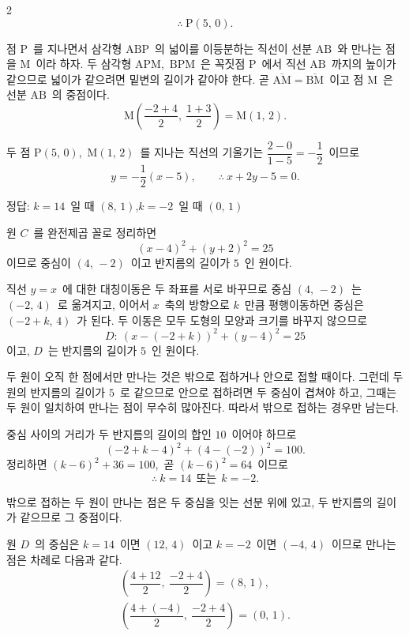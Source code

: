 \documentclass[10pt,fleqn]{article}
\begin{document}
\begin{multicols*}{2}
$$\therefore\ \mathrm{P}(5,\,0).$$

점 $\mathrm{P}$\ 를 지나면서 삼각형 $\mathrm{ABP}$\ 의 넓이를 이등분하는 직선이 선분 $\mathrm{AB}$\ 와 만나는 점을 $\mathrm{M}$\ 이라 하자. 두 삼각형 $\mathrm{APM}$,\ $\mathrm{BPM}$\ 은 꼭짓점 $\mathrm{P}$\ 에서 직선 $\mathrm{AB}$\ 까지의 높이가 같으므로 넓이가 같으려면 밑변의 길이가 같아야 한다. 곧 $\overline{\mathrm{AM}}=\overline{\mathrm{BM}}$\ 이고 점 $\mathrm{M}$\ 은 선분 $\mathrm{AB}$\ 의 중점이다.
$$\mathrm{M}\!\left(\dfrac{-2+4}{2},\ \dfrac{1+3}{2}\right)=\mathrm{M}(1,\,2).$$

두 점 $\mathrm{P}(5,\,0)$,\ $\mathrm{M}(1,\,2)$\ 를 지나는 직선의 기울기는 $\dfrac{2-0}{1-5}=-\dfrac{1}{2}$\ 이므로
$$y=-\dfrac{1}{2}(x-5),\qquad \therefore\ x+2y-5=0.$$

\begin{dmanswerbox}
정답: $k=14$\ 일 때 $(8,\,1)$,\quad $k=-2$\ 일 때 $(0,\,1)$
\end{dmanswerbox}

원 $C$\ 를 완전제곱 꼴로 정리하면
$$(x-4)^{2}+(y+2)^{2}=25$$
이므로 중심이 $(4,\,-2)$\ 이고 반지름의 길이가 $5$\ 인 원이다.

직선 $y=x$\ 에 대한 대칭이동은 두 좌표를 서로 바꾸므로 중심 $(4,\,-2)$\ 는 $(-2,\,4)$\ 로 옮겨지고, 이어서 $x$\ 축의 방향으로 $k$\ 만큼 평행이동하면 중심은 $(-2+k,\,4)$\ 가 된다. 두 이동은 모두 도형의 모양과 크기를 바꾸지 않으므로
$$D:\ (x-(-2+k))^{2}+(y-4)^{2}=25$$
이고, $D$\ 는 반지름의 길이가 $5$\ 인 원이다.

두 원이 오직 한 점에서만 만나는 것은 밖으로 접하거나 안으로 접할 때이다. 그런데 두 원의 반지름의 길이가 $5$\ 로 같으므로 안으로 접하려면 두 중심이 겹쳐야 하고, 그때는 두 원이 일치하여 만나는 점이 무수히 많아진다. 따라서 밖으로 접하는 경우만 남는다.

중심 사이의 거리가 두 반지름의 길이의 합인 $10$\ 이어야 하므로
$$(-2+k-4)^{2}+(4-(-2))^{2}=100.$$
정리하면 $(k-6)^{2}+36=100$,\ 곧 $(k-6)^{2}=64$\ 이므로
$$\therefore\ k=14\ \ \text{또는}\ \ k=-2.$$

밖으로 접하는 두 원이 만나는 점은 두 중심을 잇는 선분 위에 있고, 두 반지름의 길이가 같으므로 그 중점이다.

원 $D$\ 의 중심은 $k=14$\ 이면 $(12,\,4)$\ 이고 $k=-2$\ 이면 $(-4,\,4)$\ 이므로 만나는 점은 차례로 다음과 같다.
\begin{gather*}
\left(\dfrac{4+12}{2},\ \dfrac{-2+4}{2}\right)=(8,\,1),\\[4pt]
\left(\dfrac{4+(-4)}{2},\ \dfrac{-2+4}{2}\right)=(0,\,1).
\end{gather*}


\end{multicols*}
\end{document}
